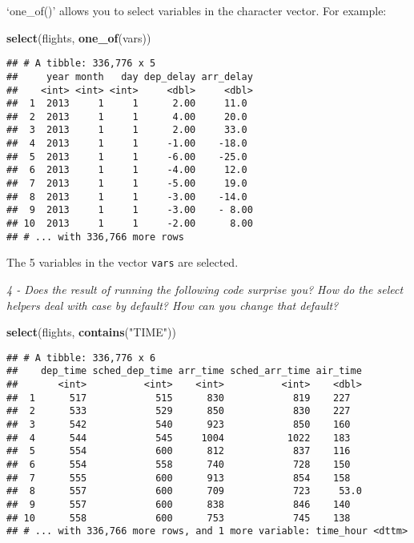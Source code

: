 \documentclass[]{article}
\newenvironment{Shaded}{\begin{snugshade}}{\end{snugshade}}
\newcommand{\KeywordTok}[1]{\textcolor[rgb]{0.13,0.29,0.53}{\textbf{#1}}}
\newcommand{\StringTok}[1]{\textcolor[rgb]{0.31,0.60,0.02}{#1}}
\newcommand{\NormalTok}[1]{#1}
\theoremstyle{definition}
\theoremstyle{definition}
\theoremstyle{definition}
\theoremstyle{remark}
\begin{document}
`one\_of()' allows you to select variables in the character vector. For
example:

\begin{Shaded}
\begin{Highlighting}[]
\KeywordTok{select}\NormalTok{(flights, }\KeywordTok{one_of}\NormalTok{(vars))}
\end{Highlighting}
\end{Shaded}

\begin{verbatim}
## # A tibble: 336,776 x 5
##     year month   day dep_delay arr_delay
##    <int> <int> <int>     <dbl>     <dbl>
##  1  2013     1     1      2.00     11.0 
##  2  2013     1     1      4.00     20.0 
##  3  2013     1     1      2.00     33.0 
##  4  2013     1     1     -1.00    -18.0 
##  5  2013     1     1     -6.00    -25.0 
##  6  2013     1     1     -4.00     12.0 
##  7  2013     1     1     -5.00     19.0 
##  8  2013     1     1     -3.00    -14.0 
##  9  2013     1     1     -3.00    - 8.00
## 10  2013     1     1     -2.00      8.00
## # ... with 336,766 more rows
\end{verbatim}

The 5 variables in the vector \texttt{vars} are selected.

\emph{4 - Does the result of running the following code surprise you?
How do the select helpers deal with case by default? How can you change
that default?}

\begin{Shaded}
\begin{Highlighting}[]
\KeywordTok{select}\NormalTok{(flights, }\KeywordTok{contains}\NormalTok{(}\StringTok{"TIME"}\NormalTok{))}
\end{Highlighting}
\end{Shaded}

\begin{verbatim}
## # A tibble: 336,776 x 6
##    dep_time sched_dep_time arr_time sched_arr_time air_time
##       <int>          <int>    <int>          <int>    <dbl>
##  1      517            515      830            819    227  
##  2      533            529      850            830    227  
##  3      542            540      923            850    160  
##  4      544            545     1004           1022    183  
##  5      554            600      812            837    116  
##  6      554            558      740            728    150  
##  7      555            600      913            854    158  
##  8      557            600      709            723     53.0
##  9      557            600      838            846    140  
## 10      558            600      753            745    138  
## # ... with 336,766 more rows, and 1 more variable: time_hour <dttm>
\end{verbatim}
\end{document}
